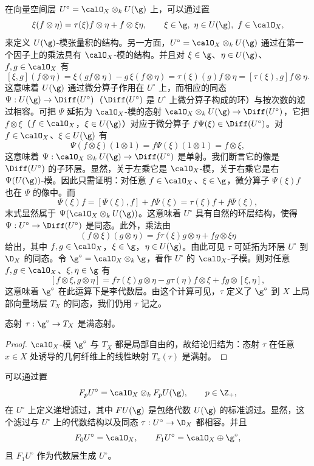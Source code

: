 在向量空间层 $U^\circ=\calO_X\otimes_k U(\g)$ 上，可以通过置
$$\xi(f\otimes\eta)=\tau(\xi)f\otimes\eta+f\otimes\xi\eta,\qquad \xi\in\g,\ \eta\in U(\g),\ f\in\calO_X,$$
来定义 $U(\g)$-模张量积的结构。另一方面，$U^\circ=\calO_X\otimes_k U(\g)$ 通过在第一个因子上的乘法具有 $\calO_X$-模的结构。并且对 $\xi\in\g$、$\eta\in U(\g)$、$f,g\in\calO_X$ 有
$$[\xi,g](f\otimes\eta)=\xi(gf\otimes\eta)-g\,\xi(f\otimes\eta)=\tau(\xi)(g)f\otimes\eta=[\tau(\xi),g]f\otimes\eta.$$
这意味着 $U(\g)$ 通过微分算子作用在 $U^\circ$ 上，而相应的同态 $\Psi:U(\g)\to\Diff(U^\circ)$（$\Diff(U^\circ)$ 是 $U^\circ$ 上微分算子构成的环）与按次数的滤过相容。可把 $\Psi$ 延拓为 $\calO_X$-模的态射 $\calO_X\otimes_k U(\g)\to\Diff(U^\circ)$，它把 $f\otimes\xi$（$f\in\calO_X$，$\xi\in U(\g)$）对应于微分算子 $f\Psi(\xi)\in\Diff(U^\circ)$。对 $f\in\calO_X$、$\xi\in U(\g)$ 有
$$\Psi(f\otimes\xi)(1\otimes 1)=f\Psi(\xi)(1\otimes 1)=f\otimes\xi,$$
这意味着 $\Psi:\calO_X\otimes_k U(\g)\to\Diff(U^\circ)$ 是单射。我们断言它的像是 $\Diff(U^\circ)$ 的子环层。显然，关于左乘它是 $\calO_X$-模，关于右乘它是右 $\Psi(U(\g))$-模。因此只需证明：对任意 $f\in\calO_X$、$\xi\in\g$，微分算子 $\Psi(\xi)f$ 也在 $\Psi$ 的像中。而
$$\Psi(\xi)f=[\Psi(\xi),f]+f\Psi(\xi)=\tau(\xi)f+f\Psi(\xi),$$
末式显然属于 $\Psi(\calO_X\otimes_k U(\g))$。这意味着 $U^\circ$ 具有自然的环层结构，使得 $\Psi:U^\circ\to\Diff(U^\circ)$ 是同态。此外，乘法由
$$(f\otimes\xi)(g\otimes\eta)=f\tau(\xi)g\otimes\eta+fg\otimes\xi\eta$$
给出，其中 $f,g\in\calO_X$，$\xi\in\g$，$\eta\in U(\g)$。由此可见 $\tau$ 可延拓为环层 $U^\circ$ 到 $\D_X$ 的同态。令 $\g^\circ=\calO_X\otimes_k\g$，看作 $U^\circ$ 的 $\calO_X$-子模。则对任意 $f,g\in\calO_X$、$\xi,\eta\in\g$ 有
$$[f\otimes\xi,g\otimes\eta]=f\tau(\xi)g\otimes\eta-g\tau(\eta)f\otimes\xi+fg\otimes[\xi,\eta],$$
这意味着 $\g^\circ$ 在此运算下是李代数层。由这个计算可见，$\tau$ 定义了 $\g^\circ$ 到 $X$ 上局部向量场层 $T_X$ 的同态，我们仍用 $\tau$ 记之。

\begin{lemma}\label{lem:01.2.1}
态射 $\tau:\g^\circ\to T_X$ 是满态射。
\end{lemma}

\begin{proof}
$\calO_X$-模 $\g^\circ$ 与 $T_X$ 都是局部自由的，故结论归结为：态射 $\tau$ 在任意 $x\in X$ 处诱导的几何纤维上的线性映射 $T_x(\tau)$ 是满射。
\end{proof}

可以通过置
$$F_pU^\circ=\calO_X\otimes_k F_pU(\g),\qquad p\in\Z_+,$$
在 $U^\circ$ 上定义递增滤过，其中 $FU(\g)$ 是包络代数 $U(\g)$ 的标准滤过。显然，这个滤过与 $U^\circ$ 上的代数结构以及同态 $\tau:U^\circ\to\D_X$ 都相容。并且
$$F_0U^\circ=\calO_X,\qquad F_1U^\circ=\calO_X\oplus\g^\circ,$$
且 $F_1U^\circ$ 作为代数层生成 $U^\circ$。

